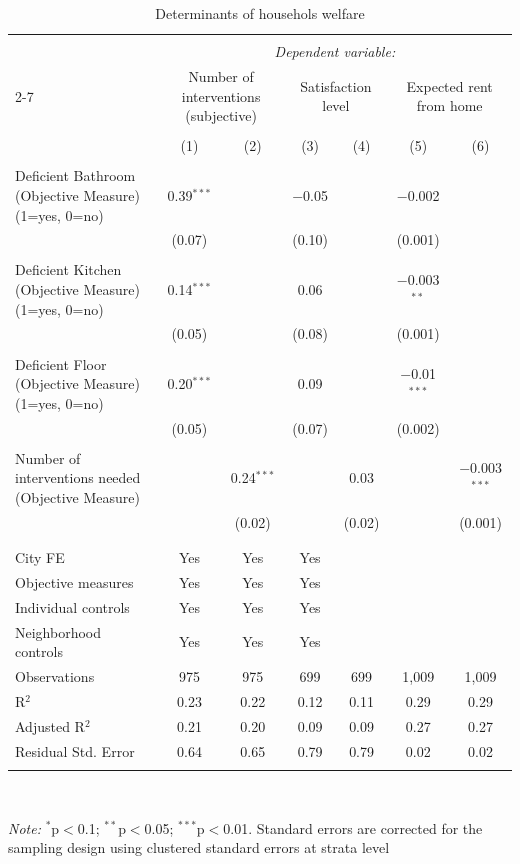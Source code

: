  \begin{table}[H] \centering    \caption{Determinants of househols welfare}    \label{reg_prod_pca}  \tiny  \begin{tabularx}{0.9\textwidth}{@{\extracolsep{-7pt}}lcccccc}  \\[-1.8ex]\hline  \hline \\[-1.8ex]   & \multicolumn{6}{c}{\textit{Dependent variable:}} \\  \cline{2-7}   & \multicolumn{2}{c}{Number of interventions (subjective)} & \multicolumn{2}{c}{Satisfaction level} & \multicolumn{2}{c}{Expected rent from home} \\  \\[-1.8ex] & (1) & (2) & (3) & (4) & (5) & (6)\\  \hline \\[-1.8ex]   Deficient Bathroom (Objective Measure) (1=yes, 0=no) & 0.39$^{***}$ &  & $-$0.05 &  & $-$0.002 &  \\    & (0.07) &  & (0.10) &  & (0.001) &  \\    & & & & & & \\   Deficient Kitchen (Objective Measure) (1=yes, 0=no) & 0.14$^{***}$ &  & 0.06 &  & $-$0.003$^{**}$ &  \\    & (0.05) &  & (0.08) &  & (0.001) &  \\    & & & & & & \\   Deficient Floor (Objective Measure) (1=yes, 0=no) & 0.20$^{***}$ &  & 0.09 &  & $-$0.01$^{***}$ &  \\    & (0.05) &  & (0.07) &  & (0.002) &  \\    & & & & & & \\   Number of interventions needed (Objective Measure) &  & 0.24$^{***}$ &  & 0.03 &  & $-$0.003$^{***}$ \\    &  & (0.02) &  & (0.02) &  & (0.001) \\    & & & & & & \\  \hline \\[-1.8ex]  City FE & Yes & Yes & Yes &  &  &  \\  Objective measures & Yes & Yes & Yes &  &  &  \\  Individual controls & Yes & Yes & Yes &  &  &  \\  Neighborhood controls & Yes & Yes & Yes &  &  &  \\  Observations & 975 & 975 & 699 & 699 & 1,009 & 1,009 \\  R$^{2}$ & 0.23 & 0.22 & 0.12 & 0.11 & 0.29 & 0.29 \\  Adjusted R$^{2}$ & 0.21 & 0.20 & 0.09 & 0.09 & 0.27 & 0.27 \\  Residual Std. Error & 0.64 & 0.65 & 0.79 & 0.79 & 0.02 & 0.02 \\  \hline  \hline \\[-1.8ex]  \end{tabularx} \\ \parbox[]{\textwidth}{\textit{Note:} $^{*}$p$<$0.1; $^{**}$p$<$0.05; $^{***}$p$<$0.01. Standard errors are corrected for the sampling design using clustered standard errors at strata level }  \end{table} 